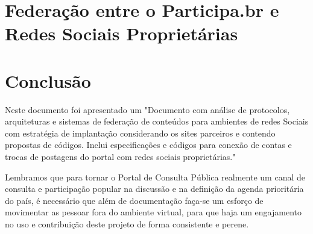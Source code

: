 \documentclass[12pt]{article}
\newcommand{\ProductDescription}{"Documento com análise de protocolos,
  arquiteturas e sistemas de federação de conteúdos para ambientes de redes
  Sociais com estratégia de implantação considerando os sites parceiros e
  contendo propostas de códigos. Inclui especificações e códigos para conexão
  de contas e trocas de postagens do portal com redes sociais proprietárias."
}
\begin{document}

\section{Federação entre o Participa.br e Redes Sociais Proprietárias}


\section{Conclusão}

Neste documento foi apresentado um \ProductDescription

%
%

Lembramos que para tornar o Portal de Consulta Pública realmente um canal de
consulta e participação popular na discussão e na definição da agenda
prioritária do país, é necessário que além de documentação faça-se um esforço
de movimentar as pessoar fora do ambiente virtual, para que haja um
engajamento no uso e contribuição deste projeto de forma consistente e perene.

\newpage

\newpage
\listoffigures
\newpage
\printindex
\newpage

\newpage
\appendix
\appendixpage

\end{document}
